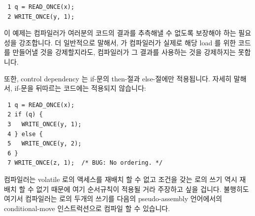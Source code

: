 \begin{enumerate}
\vspace{5pt}
\begin{minipage}[t]{\columnwidth}
\scriptsize
\begin{verbatim}
 1 q = READ_ONCE(x);
 2 WRITE_ONCE(y, 1);
\end{verbatim}
\end{minipage}
\vspace{5pt}

이 예제는 컴파일러가 여러분의 코드의 결과를 추측해낼 수 없도록 보장해야 하는
필요성을 강조합니다.
더 일반적으로 말해서,  가 컴파일러가 실제로 해당 load 를 위한
코드를 만들어낼 것을 강제할지라도, 컴파일러가 그 결과를 사용하는 것을
강제하지는 못합니다.

또한, control dependency 는 if-문의 then-절과 else-절에만 적용됩니다.
자세히 말해서, if-문을 뒤따르는 코드에는 적용되지 않습니다:

\vspace{5pt}
\begin{minipage}[t]{\columnwidth}
\scriptsize
\begin{verbatim}
 1 q = READ_ONCE(x);
 2 if (q) {
 3   WRITE_ONCE(y, 1);
 4 } else {
 5   WRITE_ONCE(y, 2);
 6 }
 7 WRITE_ONCE(z, 1);  /* BUG: No ordering. */
\end{verbatim}
\end{minipage}
\vspace{5pt}

컴파일러는 volatile 로의 액세스를 재배치 할 수 없고 조건을 갖는  로의
쓰기 역시 재배치 할 수 없기 때문에 여기 순서규칙이 적용될 거라 주장하고 싶을
겁니다.
불행히도 여기서 컴파일러는  로의 두개의 쓰기를 다음의 pseudo-assembly
언어에서의 conditional-move 인스트럭션으로 컴파일 할 수 있습니다.

\end{enumerate}
